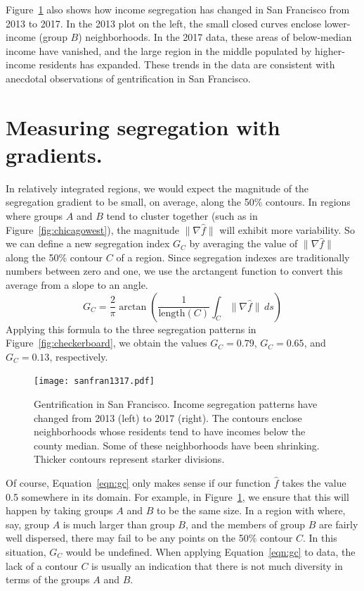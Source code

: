 \documentclass{article}
\theoremstyle{theorem}
\theoremstyle{definition}
\begin{document}
Figure~\ref{fig:sanfran1317} also shows how income segregation has changed in San Francisco from 2013 to 2017. In the 2013 plot on the left, the small closed curves enclose lower-income (group $B$) neighborhoods. In the 2017 data, these areas of below-median income have vanished, and the large region in the middle populated by higher-income residents has expanded. These trends in the data are consistent with anecdotal observations of gentrification in San Francisco. \cite{pogash15}

\section{Measuring segregation with gradients.}

In relatively integrated regions, we would expect the magnitude of the segregation gradient to be small, on average, along the 50\% contours. In regions where groups $A$ and $B$ tend to cluster together (such as in Figure~\ref{fig:chicagowest}), the magnitude $\lVert \nabla \hat{f} \rVert$ will exhibit more variability. So we can define a new segregation index $G_C$ by averaging the value of  $\lVert \nabla \hat{f} \rVert$ along the 50\% contour $C$ of a region. Since segregation indexes are traditionally numbers between zero and one, we use the arctangent function to convert this average from a slope to an angle.
\begin{equation}\label{eqn:gc}
   G_C = \frac{2}{\pi} \arctan \left(\frac{1}{\mathrm{length}(C)} \int_C \lVert \nabla \hat{f} \rVert \, ds \right)
\end{equation}
Applying this formula to the three segregation patterns in Figure~\ref{fig:checkerboard}, we obtain the values $G_C=0.79$, $G_C=0.65$, and $G_C=0.13$, respectively.

\begin{figure}[t!]
  \texttt{[image: sanfran1317.pdf]} %
  \caption{Gentrification in San Francisco. Income segregation patterns have changed from 2013 (left) to 2017 (right). The contours enclose neighborhoods whose residents tend to have incomes below the county median. Some of these neighborhoods have been shrinking. Thicker contours represent starker divisions.}
  \label{fig:sanfran1317}
\end{figure}

Of course, Equation~\ref{eqn:gc} only makes sense if our function $\hat{f}$ takes the value 0.5 somewhere in its domain. For example, in Figure~\ref{fig:sanfran1317}, we ensure that this will happen by taking groups $A$ and $B$ to be the same size. In a region with where, say, group $A$ is much larger than group $B$, and the members of group $B$ are fairly well dispersed, there may fail to be any points on the 50\% contour $C$. In this situation, $G_C$ would be undefined. When applying Equation~\ref{eqn:gc} to data, the lack of a contour $C$ is usually an indication that there is not much diversity in terms of the groups $A$ and $B$.
\end{document}
